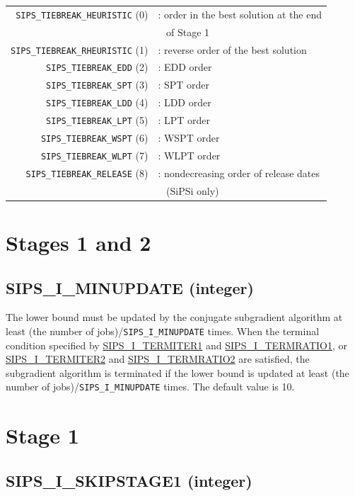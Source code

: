 \documentclass[a4paper]{book}
\begin{document}
\begin{tabular}{r@{~}l}
  \verb+SIPS_TIEBREAK_HEURISTIC+ (0)
  &: order in the best solution at the end\\
  &~ of Stage 1\\
  \verb+SIPS_TIEBREAK_RHEURISTIC+ (1)
  &: reverse order of the best solution\\
  \verb+SIPS_TIEBREAK_EDD+ (2)
  &: EDD order\\
  \verb+SIPS_TIEBREAK_SPT+ (3)
  &: SPT order\\
  \verb+SIPS_TIEBREAK_LDD+ (4)
  &: LDD order\\
  \verb+SIPS_TIEBREAK_LPT+ (5)
  &: LPT order\\
  \verb+SIPS_TIEBREAK_WSPT+ (6)
  &: WSPT order\\
  \verb+SIPS_TIEBREAK_WLPT+ (7)
  &: WLPT order\\
  \verb+SIPS_TIEBREAK_RELEASE+ (8)
  &: nondecreasing order of release dates\\
  &~ (SiPSi only)\\
\end{tabular}

\section{Stages 1 and 2}

\hypertarget{MINUPDATE}{%
\subsection{SIPS\_I\_MINUPDATE (integer)}
}

The lower bound must be updated by the conjugate subgradient algorithm at least (the number of jobs)/\verb+SIPS_I_MINUPDATE+ times.
When the terminal condition specified by \hyperlink{TERMITER1}{SIPS\_I\_TERMITER1} and \hyperlink{TERMRATIO1}{SIPS\_I\_TERMRATIO1}, or \hyperlink{TERMITER2}{SIPS\_I\_TERMITER2} and \hyperlink{TERMRATIO2}{SIPS\_I\_TERMRATIO2} are satisfied, the subgradient algorithm is terminated if the lower bound is updated at least (the number of jobs)/\verb+SIPS_I_MINUPDATE+ times.
The default value is 10.


\section{Stage 1}

\hypertarget{SKIPSTAGE1}{%
\subsection{SIPS\_I\_SKIPSTAGE1 (integer)}
}
\end{document}

